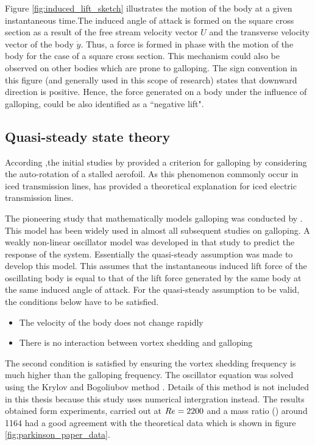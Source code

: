 

 Figure \ref{fig:induced_lift_sketch}  illustrates the motion of the body at a given instantaneous time.The induced angle of attack is formed on the square cross section as a result of the free stream velocity vector $U$ and the transverse velocity vector of the body $\dot{y}$. Thus, a force is formed in phase with the motion of the body for the case of a square cross section. This mechanism could also be observed on other bodies which are prone to galloping. The sign convention in this figure (and generally used in this scope of research) states that downward direction is positive. Hence, the force generated on a body under the influence of galloping, could be also identified as a ``negative lift".
 

\subsection{Quasi-steady state theory}
\label{sec:QSS theory}


According \cite{Paidoussis2010},the initial studies by \cite{Glauert1919} provided a criterion for galloping by considering the auto-rotation of a stalled aerofoil. As this phenomenon commonly occur in iced transmission lines, \cite{DenHartog1956} has provided a theoretical explanation for iced electric transmission lines. 

The pioneering study that mathematically models galloping was conducted by \cite{Parkinson1964}. This model has been widely used in almost all subsequent studies on galloping. A weakly non-linear oscillator model was developed in that study to predict the response of the system. Essentially the quasi-steady assumption was made to develop this model. This assumes that the instantaneous induced lift force of the oscillating body is equal to that of the lift force generated by the same body at the same induced angle of attack. For the quasi-steady assumption to be valid, the conditions below have to be satisfied.

\begin{itemize}
 \item The velocity of the body does not change rapidly
 \item There is no interaction between vortex shedding and galloping
\end{itemize}

The second condition is satisfied by ensuring the vortex shedding frequency is much higher than the galloping frequency.
The oscillator equation was solved using the Krylov and Bogoliubov method \citep{Parkinson1964}. Details of this method is not included in this thesis because this study uses numerical intergration instead. The results obtained form experiments, carried out at $Re=2200$ and a mass ratio (\mstar) around 1164 had a good agreement with the theoretical data which is shown in figure \ref{fig:parkinson_paper_data}.

